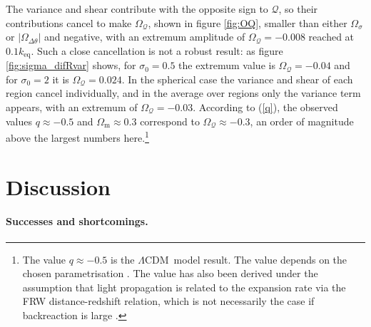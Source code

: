 \documentclass[11pt, a4paper]{article}
\newcommand{\re}[1]{(\ref{#1})}
\newcommand{\fig}[1]{figure \ref{#1}}
\newcommand{\para}{\paragraph}
\newcommand{\LCDM}{$\Lambda$CDM\ }
\newcommand{\keq}{k_{\mathrm{eq}}}
\newcommand{\sQ}{\mathcal{Q}}
\newcommand{\Om}{\Omega_{\mathrm{m}}}
\newcommand{\OQ}{\Omega_{\sQ}}
\newcommand{\Ov}{\Omega_{\Delta\theta}}
\begin{document}
The variance and shear contribute with the opposite sign to $\sQ$, so their contributions cancel to make $\OQ$, shown in figure \ref{fig:OQ}, smaller than either $\Omega_\sigma$ or $|\Ov|$ and negative, with an extremum amplitude of $\OQ=-0.008$ reached at $0.1\keq$. Such a close cancellation is not a robust result: as \fig{fig:sigma_difRvar} shows, for $\sigma_0=0.5$ the extremum value is $\OQ=-0.04$ and for $\sigma_0=2$ it is $\OQ=0.024$.
In the spherical case the variance and shear of each region cancel individually, and in the average over regions only the variance term appears, with an extremum of $\OQ=-0.03$. According to \re{q}, the observed values $q\approx-0.5$ and $\Om\approx0.3$ correspond to $\OQ\approx-0.3$, an order of magnitude above the largest numbers here.\footnote{The value $q\approx-0.5$ is the \LCDM model result. The value depends on the chosen parametrisation \cite{Shapiro:2005nz, *Gong:2006tx, *Elgaroy:2006tp, *Seikel:2007pk, *Seikel:2008ms, *Mortsell:2008yu, *Guimaraes:2009mp, *Serra:2009yp, *Cai:2010qp, *Wang:2010vj, *Park:2010xw, *Pan:2010zh, *Cai:2011px, *Li:2011wb, *Shafieloo:2012ht, *Aviles:2012ay, *Magana:2014voa, *Qing-Guo:2016ykt, *Ade:2015rim, Cattoen:2007id, *Visser:2009zs}. The value has also been derived under the assumption that light propagation is related to the expansion rate via the FRW distance-redshift relation, which is not necessarily the case if backreaction is large \cite{Rasanen:2008be, Rasanen:2009uw, Clarkson:2011br, Bull:2012zx, Boehm:2013qqa, Lavinto:2013exa}.}

\section{Discussion} \label{sec:disc}

\para{Successes and shortcomings.}
\end{document}
